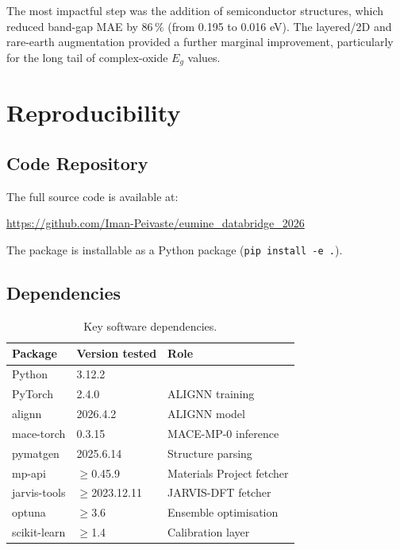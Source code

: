 \documentclass[10pt, a4paper]{article}
\begin{document}
The most impactful step was the addition of semiconductor structures,
which reduced band-gap MAE by $86\,\%$ (from 0.195 to 0.016 eV).
The layered/2D and rare-earth augmentation provided a further marginal
improvement, particularly for the long tail of complex-oxide $E_g$
values.

\section{Reproducibility}

\subsection{Code Repository}

The full source code is available at:
\begin{center}
\url{https://github.com/Iman-Peivaste/eumine_databridge_2026}
\end{center}
The package is installable as a Python package (\texttt{pip install -e .}).

\subsection{Dependencies}

\begin{table}[h!]
\centering
\caption{Key software dependencies.}
\label{tab:deps}
\begin{tabular}{@{}lll@{}}
\toprule
Package & Version tested & Role \\
\midrule
Python     & 3.12.2  & \\
PyTorch    & 2.4.0   & ALIGNN training \\
alignn     & 2026.4.2 & ALIGNN model \\
mace-torch & 0.3.15  & MACE-MP-0 inference \\
pymatgen   & 2025.6.14 & Structure parsing \\
mp-api     & $\geq$0.45.9 & Materials Project fetcher \\
jarvis-tools & $\geq$2023.12.11 & JARVIS-DFT fetcher \\
optuna     & $\geq$3.6 & Ensemble optimisation \\
scikit-learn & $\geq$1.4 & Calibration layer \\
\bottomrule
\end{tabular}
\end{table}
\end{document}
